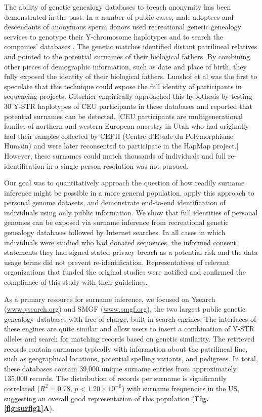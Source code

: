 The ability of genetic genealogy databases to breach anonymity has been demonstrated in the past. In a number of public cases, male adoptees and descendants of anonymous sperm donors used recreational genetic genealogy services to genotype their Y-chromosome haplotypes and to search the companies' databases \cite{Lehmann-Haupt2010,Naik2009,Stein2005,Motluk2005}. The genetic matches identified distant patrilineal relatives and pointed to the potential surnames of their biological fathers. By combining other pieces of demographic information, such as date and place of birth, they fully exposed the identity of their biological fathers. Lunshof et al \cite{LunshofChadwickVorhausEtAl2008} was the first to speculate that this technique could expose the full identity of participants in sequencing projects. Gitschier \cite{Gitschier2009} empirically approached this hypothesis by testing 30 Y-STR haplotypes of CEU participants in these databases and reported that potential surnames can be detected.  [CEU participants are multigenerational familes of  northern and western European ancestry in Utah who had originally had their samples collected by CEPH (Centre d'Etude du Polymorphisme Humain) and were later reconsented to participate in the HapMap project.] However, these surnames could match thousands of individuals and full re-identification in a single person resolution was not pursued. 

Our goal was to quantitatively approach the question of how readily surname inference might be possible in a more general population, apply this approach to personal genome datasets, and demonstrate end-to-end identification of individuals using only public information. We show that full identities of personal genomes can be exposed via surname inference from recreational genetic genealogy databases followed by Internet searches. In all cases in which individuals were studied who had donated sequences, the informed consent statements they had signed stated privacy breach as a potential risk and the data usage terms did not prevent re-identification. Representatives of relevant organizations that funded the original studies were notified and confirmed the compliance of this study with their guidelines.

As a primary resource for surname inference, we focused on Ysearch (\url{www.ysearch.org}) and SMGF (\url{www.smgf.org}), the two largest public genetic genealogy databases with free-of-charge, built-in search engines. The interfaces of these engines are quite similar and allow users to insert a combination of Y-STR alleles and search for matching records based on genetic similarity. The retrieved records contain surnames typically with information about the patrilineal line, such as geographical locations, potential spelling variants, and pedigrees. In total, these databases contain 39,000 unique surname entries from approximately 135,000 records. The distribution of records per surname is significantly correlated ($R^2=0.78$, $p<1.20\times 10^{-6}$) with surname frequencies in the US, suggesting an overall good representation of this population (\textbf{Fig. \ref{fig:surfig1}A}).


